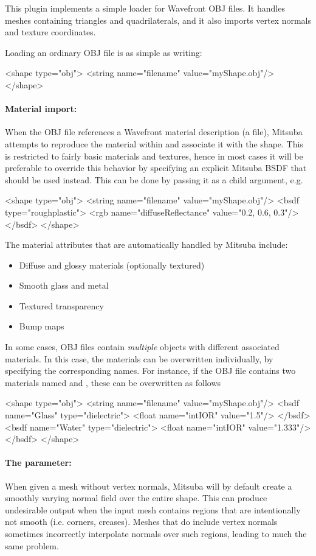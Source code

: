 This plugin implements a simple loader for Wavefront OBJ files. It handles
meshes containing triangles and quadrilaterals, and it also imports vertex normals
and texture coordinates.

Loading an ordinary OBJ file is as simple as writing:
\begin{xml}
<shape type="obj">
    <string name="filename" value="myShape.obj"/>
</shape>
\end{xml}
\paragraph{Material import:}
When the OBJ file references a Wavefront material description (a  file),
Mitsuba attempts to reproduce the material within and associate it with the shape.
This is restricted to fairly basic materials and textures, hence in most cases
it will be preferable to override this behavior by specifying an
explicit Mitsuba BSDF that should be used instead.
This can be done by passing it as a child argument, e.g.
\begin{xml}
<shape type="obj">
    <string name="filename" value="myShape.obj"/>
    <bsdf type="roughplastic">
        <rgb name="diffuseReflectance" value="0.2, 0.6, 0.3"/>
    </bsdf>
</shape>
\end{xml}
The  material attributes that are automatically handled by Mitsuba include:
\begin{itemize}
\item Diffuse and glossy materials (optionally textured)
\item Smooth glass and metal
\item Textured transparency
\item Bump maps
\end{itemize}

In some cases, OBJ files contain \emph{multiple} objects with different associated
materials. In this case, the materials can be overwritten individually, by specifying
the corresponding names. For instance, if the OBJ file contains two materials named
 and , these can be overwritten as follows
\begin{xml}
<shape type="obj">
    <string name="filename" value="myShape.obj"/>
    <bsdf name="Glass" type="dielectric">
        <float name="intIOR" value="1.5"/>
    </bsdf>
    <bsdf name="Water" type="dielectric">
        <float name="intIOR" value="1.333"/>
    </bsdf>
</shape>
\end{xml}
\paragraph{The  parameter:}
\label{sec:maxSmoothAngle}
When given a mesh without vertex normals, Mitsuba will by default
create a smoothly varying normal field over the entire shape. This can produce
undesirable output when the input mesh contains regions that are intentionally
not smooth (i.e. corners, creases). Meshes that do include vertex
normals sometimes incorrectly interpolate normals over such regions, leading to
much the same problem.

